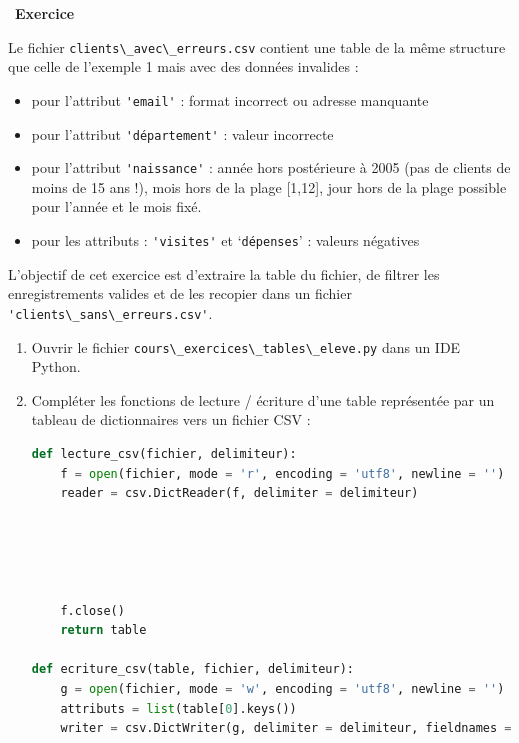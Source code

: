 \documentclass[
  11pt,
]{article}
\newcommand{\passthrough}[1]{#1}
\providecommand{\tightlist}{%
  \setlength{\itemsep}{0pt}\setlength{\parskip}{0pt}}
\newcounter{exo}
\newenvironment{exercice}[1]
{\par \medskip   \addtocounter{exo}{1} \noindent  
\begin{bclogo}[arrondi =0.1,   noborder = true, logo=\bccrayon, marge=4]{~\textbf{Exercice} \textbf{\theexo} {\itshape #1} }  \par}
{
\end{bclogo}
 \par \bigskip }
\newcounter{def}
\newcounter{cours}
\begin{document}
\begin{exercice}{}

Le fichier \passthrough{\lstinline!clients\_avec\_erreurs.csv!} contient
une table de la même structure que celle de l'exemple 1 mais avec des
données invalides :

\begin{itemize}
\tightlist
\item
  pour l'attribut \passthrough{\lstinline!'email'!} : format incorrect
  ou adresse manquante
\item
  pour l'attribut \passthrough{\lstinline!'département'!} : valeur
  incorrecte
\item
  pour l'attribut \passthrough{\lstinline!'naissance'!} : année hors
  postérieure à 2005 (pas de clients de moins de 15 ans !), mois hors de
  la plage {[}1,12{]}, jour hors de la plage possible pour l'année et le
  mois fixé.
\item
  pour les attributs : \passthrough{\lstinline!'visites'!} et
  `\passthrough{\lstinline!dépenses!}' : valeurs négatives
\end{itemize}

L'objectif de cet exercice est d'extraire la table du fichier, de
filtrer les enregistrements valides et de les recopier dans un fichier
\passthrough{\lstinline!'clients\_sans\_erreurs.csv'!}.

\begin{enumerate}
\def\labelenumi{\arabic{enumi}.}
\item
  Ouvrir le fichier
  \passthrough{\lstinline!cours\_exercices\_tables\_eleve.py!} dans un
  IDE Python.
\item
  Compléter les fonctions de lecture / écriture d'une table représentée
  par un tableau de dictionnaires vers un fichier CSV :

\begin{lstlisting}[language=Python]
def lecture_csv(fichier, delimiteur):   
    f = open(fichier, mode = 'r', encoding = 'utf8', newline = '')
    reader = csv.DictReader(f, delimiter = delimiteur)  





    f.close()
    return table

def ecriture_csv(table, fichier, delimiteur):
    g = open(fichier, mode = 'w', encoding = 'utf8', newline = '')
    attributs = list(table[0].keys())
    writer = csv.DictWriter(g, delimiter = delimiteur, fieldnames = attributs) 






\end{lstlisting}
\end{enumerate}
\end{exercice}
\end{document}

